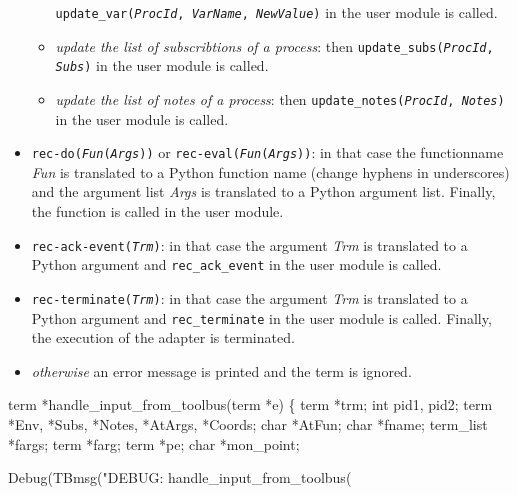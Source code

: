 \begin{itemize}
\begin{itemize}
    \texttt{update\_var(\emph{ProcId}, \emph{VarName},
      \emph{NewValue})} in the user module is called.
  \item \emph{update the list of subscribtions of a process}: then 
    \texttt{update\_subs(\emph{ProcId}, \emph{Subs})} in the user
    module is called.
  \item \emph{update the list of notes of a process}: then 
    \texttt{update\_notes(\emph{ProcId}, \emph{Notes})} in the user
    module is called.
  \end{itemize}
\item \texttt{rec-do(\emph{Fun}(\emph{Args}))} or
  \texttt{rec-eval(\emph{Fun}(\emph{Args}))}: in that case the
  functionname \emph{Fun} is translated to a Python function name
  (change hyphens in underscores) and the argument list \emph{Args} is
  translated to a Python argument list. Finally, the function is
  called in the user module.
\item \texttt{rec-ack-event(\emph{Trm})}: in that case the argument
  \emph{Trm} is translated to a Python argument and
  \texttt{rec\_ack\_event} in the user module is called.
\item \texttt{rec-terminate(\emph{Trm})}: in that case the argument
  \emph{Trm} is translated to a Python argument and
  \texttt{rec\_terminate} in the user module is called.  Finally, the
  execution of the adapter is terminated.
\item \emph{otherwise} an error message is printed and the term is
  ignored.
\end{itemize}
\nwenddocs{}\plusendmoddef\nwstartdeflinemarkup{}\nwenddeflinemarkup
term *handle_input_from_toolbus(term *e) \{
  term *trm;  
  int pid1, pid2;
  term *Env, *Subs, *Notes, *AtArgs, *Coords;
  char *AtFun;
  char *fname;
  term_list *fargs;
  term *farg;
  term *pe;
  char *mon_point;

  Debug(TBmsg("DEBUG: handle_input_from_toolbus(%


